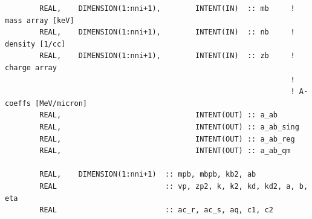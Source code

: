 \documentclass[preprint,12pt,eqsecnum,nofootinbib,amsmath,amssymb]{revtex4}
\begin{document}
{\begin{verbatim}
        REAL,    DIMENSION(1:nni+1),        INTENT(IN)  :: mb     !  mass array [keV]
        REAL,    DIMENSION(1:nni+1),        INTENT(IN)  :: nb     !  density [1/cc]
        REAL,    DIMENSION(1:nni+1),        INTENT(IN)  :: zb     !  charge array
                                                                  !
                                                                  ! A-coeffs [MeV/micron]
        REAL,                               INTENT(OUT) :: a_ab
        REAL,                               INTENT(OUT) :: a_ab_sing
        REAL,                               INTENT(OUT) :: a_ab_reg
        REAL,                               INTENT(OUT) :: a_ab_qm

        REAL,    DIMENSION(1:nni+1)  :: mpb, mbpb, kb2, ab
        REAL                         :: vp, zp2, k, k2, kd, kd2, a, b, eta
        REAL                         :: ac_r, ac_s, aq, c1, c2


\end{verbatim}}
\end{document}
